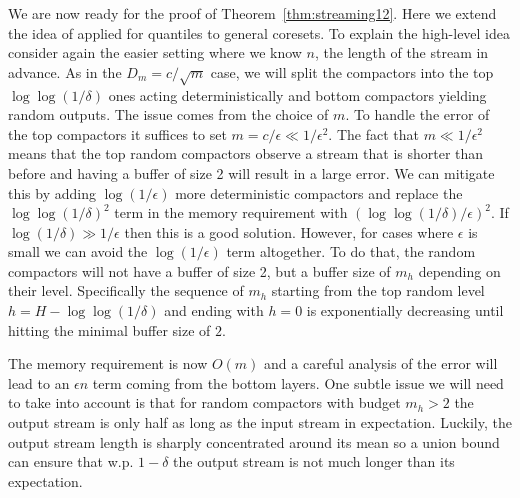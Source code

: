 \documentclass[12pt]{colt2019} %
\newcommand{\eps}{\epsilon}
\begin{document}
We are now ready for the proof of Theorem~\ref{thm:streaming12}. Here we extend the idea of \cite{DBLP:conf/focs/KarninLL16} applied for quantiles to general coresets. To explain the high-level idea consider again the easier setting where we know $n$, the length of the stream in advance. As in the $D_m=c/\sqrt{m}$ case, we will split the compactors into the top $\log\log(1/\delta)$ ones acting deterministically and bottom compactors yielding random outputs. The issue comes from the choice of $m$. To handle the error of the top compactors it suffices to set $m=c/\eps \ll 1/\eps^2$. The fact that $m \ll 1/\eps^2$ means that the top random compactors observe a stream that is shorter than before and having a buffer of size 2 will result in a large error. We can mitigate this by adding $\log(1/\eps)$ more deterministic compactors and replace the $\log\log(1/\delta)^2$ term in the memory requirement with $\left(\log\log(1/\delta)/\eps\right)^2$. If $\log(1/\delta) \gg 1/\eps$ then this is a good solution. However, for cases where $\eps$ is small we can avoid the $\log(1/\eps)$ term altogether. To do that, the random compactors will not have a buffer of size 2, but a buffer size of $m_h$ depending on their level. Specifically the sequence of $m_h$ starting from the top random level $h= H-\log\log(1/\delta)$ and ending with $h=0$ is exponentially decreasing until hitting the minimal buffer size of $2$.

The memory requirement is now $O(m)$ and a careful analysis of the error will lead to an $\eps n$ term coming from the bottom layers. One subtle issue we will need to take into account is that for random compactors with budget $m_h>2$ the output stream is only half as long as the input stream in expectation. Luckily, the output stream length is sharply concentrated around its mean so a union bound can ensure that w.p. $1-\delta$ the output stream is not much longer than its expectation.
\end{document}
